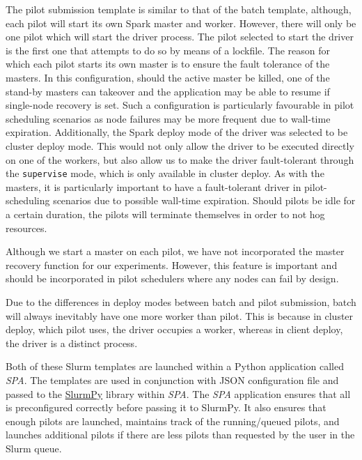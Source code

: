 	The pilot submission template is similar to that of the batch template, although,
	each pilot will start its own Spark master and worker. However, there will only be one
	pilot which will start the driver process. The pilot selected to start the driver is the first one
	that attempts to do so by means of a lockfile.
	The reason for 
	which each pilot starts its own master is to ensure the fault tolerance of the 
	masters. In this configuration, should the active master be killed, one
	of the stand-by masters can takeover and the application may be able to 
	resume if single-node recovery is set. Such a configuration is particularly favourable in pilot scheduling 
	scenarios as node failures may be more frequent due to wall-time expiration.
	Additionally, the Spark deploy mode of the driver was selected to be cluster deploy mode.
	This would not only allow the driver to be executed directly on one of the workers,
	but also allow us to make the driver fault-tolerant through the
	\texttt{supervise} mode, which is only available in cluster deploy. As
	with the masters, it is particularly important to have a fault-tolerant
	driver in pilot-scheduling scenarios due to possible wall-time
	expiration.
	Should pilots be idle for a certain duration, the
	pilots will terminate themselves in order to not hog resources.
    
	Although we start a master on each pilot, we have not incorporated the master recovery function
	for our experiments. However, this feature is important and should be incorporated in pilot schedulers
	where any nodes can fail by design.
    
	Due to the differences in deploy modes between batch and pilot submission, 
	batch will always inevitably have one more worker than pilot. This is because
	in cluster deploy, which pilot uses, the driver occupies a worker, whereas in
	client deploy, the driver is a distinct process.
    
	Both of these Slurm templates are launched within a Python application called
	\textit{SPA}. The templates are used in conjunction with JSON configuration 
	file and passed to the \href{https://github.com/brentp/slurmpy}{SlurmPy} library within \textit{SPA}.
	The \textit{SPA} application ensures that all is preconfigured
	correctly before passing it to SlurmPy. It also ensures that enough pilots are
	launched, maintains track of the running/queued pilots, and launches additional
	pilots if there are less pilots than requested by the user in the Slurm queue.
    
